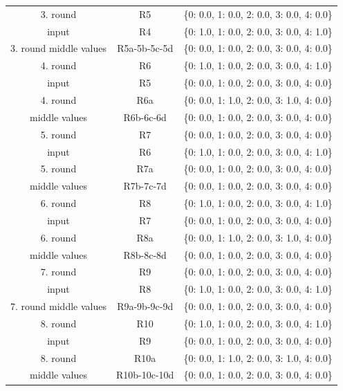 \begin{table}[ht]
\begin{tabular}{|c|c|c|}
        \hline
        3. round  & R5 & \{0: 0.0, 1: 0.0, 2: 0.0, 3: 0.0, 4: 0.0\} \\
        input     & R4 & \{0: 1.0, 1: 0.0, 2: 0.0, 3: 0.0, 4: 1.0\} \\
        \hline
        3. round middle values     & R5a-5b-5c-5d & \{0: 0.0, 1: 0.0, 2: 0.0, 3: 0.0, 4: 0.0\} \\
        \hline
        4. round  & R6 & \{0: 1.0, 1: 0.0, 2: 0.0, 3: 0.0, 4: 1.0\} \\
        input     & R5 & \{0: 0.0, 1: 0.0, 2: 0.0, 3: 0.0, 4: 0.0\} \\
        \hline
        4. round  & R6a & \{0: 0.0, 1: 1.0, 2: 0.0, 3: 1.0, 4: 0.0\} \\
        middle values & R6b-6c-6d & \{0: 0.0, 1: 0.0, 2: 0.0, 3: 0.0, 4: 0.0\} \\
                              \hline
        5. round  & R7 & \{0: 0.0, 1: 0.0, 2: 0.0, 3: 0.0, 4: 0.0\} \\
        input     & R6 & \{0: 1.0, 1: 0.0, 2: 0.0, 3: 0.0, 4: 1.0\} \\
        \hline
        5. round  & R7a & \{0: 0.0, 1: 0.0, 2: 0.0, 3: 0.0, 4: 0.0\} \\
        middle values & R7b-7c-7d & \{0: 0.0, 1: 0.0, 2: 0.0, 3: 0.0, 4: 0.0\} \\
                      
        \hline
        6. round  & R8 & \{0: 1.0, 1: 0.0, 2: 0.0, 3: 0.0, 4: 1.0\} \\
        input     & R7 & \{0: 0.0, 1: 0.0, 2: 0.0, 3: 0.0, 4: 0.0\} \\
        \hline
        6. round  & R8a & \{0: 0.0, 1: 1.0, 2: 0.0, 3: 1.0, 4: 0.0\} \\
        middle values & R8b-8c-8d & \{0: 0.0, 1: 0.0, 2: 0.0, 3: 0.0, 4: 0.0\} \\
                     
        \hline
        7. round  & R9 & \{0: 0.0, 1: 0.0, 2: 0.0, 3: 0.0, 4: 0.0\} \\
        input     & R8 & \{0: 1.0, 1: 0.0, 2: 0.0, 3: 0.0, 4: 1.0\} \\
        \hline
        7. round middle values & R9a-9b-9c-9d & \{0: 0.0, 1: 0.0, 2: 0.0, 3: 0.0, 4: 0.0\} \\
        \hline
        8. round  & R10 & \{0: 1.0, 1: 0.0, 2: 0.0, 3: 0.0, 4: 1.0\} \\
        input      & R9  & \{0: 0.0, 1: 0.0, 2: 0.0, 3: 0.0, 4: 0.0\} \\
        \hline
        8. round  & R10a & \{0: 0.0, 1: 1.0, 2: 0.0, 3: 1.0, 4: 0.0\} \\
        middle values & R10b-10c-10d & \{0: 0.0, 1: 0.0, 2: 0.0, 3: 0.0, 4: 0.0\} \\
                      

\end{tabular}
\end{table}
